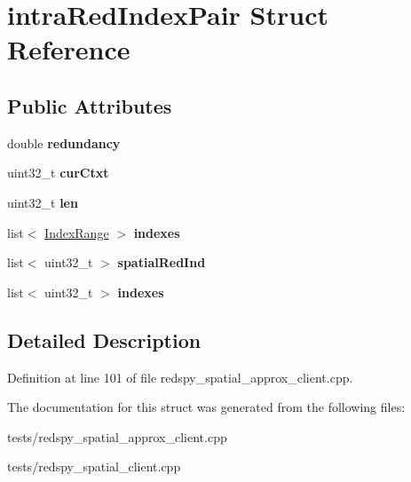 \hypertarget{structintraRedIndexPair}{\section{intra\-Red\-Index\-Pair Struct Reference}
\label{structintraRedIndexPair}
}
\subsection*{Public Attributes}
\begin{DoxyCompactItemize}
\item 
\hypertarget{structintraRedIndexPair_a5e5c52162e4e557fed60a505a42284a2}{double {\bfseries redundancy}}\label{structintraRedIndexPair_a5e5c52162e4e557fed60a505a42284a2}

\item 
\hypertarget{structintraRedIndexPair_a1ebb0aac4c91fad973404a09e5f5d370}{uint32\-\_\-t {\bfseries cur\-Ctxt}}\label{structintraRedIndexPair_a1ebb0aac4c91fad973404a09e5f5d370}

\item 
\hypertarget{structintraRedIndexPair_ac9b2debda587b1b47badf41dc80ecf82}{uint32\-\_\-t {\bfseries len}}\label{structintraRedIndexPair_ac9b2debda587b1b47badf41dc80ecf82}

\item 
\hypertarget{structintraRedIndexPair_a404e08cd874b9597f9190337c6f03306}{list$<$ \hyperlink{structindexRange}{Index\-Range} $>$ {\bfseries indexes}}\label{structintraRedIndexPair_a404e08cd874b9597f9190337c6f03306}

\item 
\hypertarget{structintraRedIndexPair_a88d82e74e6531cf0735e2258702d5448}{list$<$ uint32\-\_\-t $>$ {\bfseries spatial\-Red\-Ind}}\label{structintraRedIndexPair_a88d82e74e6531cf0735e2258702d5448}

\item 
\hypertarget{structintraRedIndexPair_a7447f32db04490567a6f5d50f3067dc1}{list$<$ uint32\-\_\-t $>$ {\bfseries indexes}}\label{structintraRedIndexPair_a7447f32db04490567a6f5d50f3067dc1}

\end{DoxyCompactItemize}


\subsection{Detailed Description}


Definition at line 101 of file redspy\-\_\-spatial\-\_\-approx\-\_\-client.\-cpp.



The documentation for this struct was generated from the following files\-:\begin{DoxyCompactItemize}
\item 
tests/redspy\-\_\-spatial\-\_\-approx\-\_\-client.\-cpp\item 
tests/redspy\-\_\-spatial\-\_\-client.\-cpp\end{DoxyCompactItemize}
